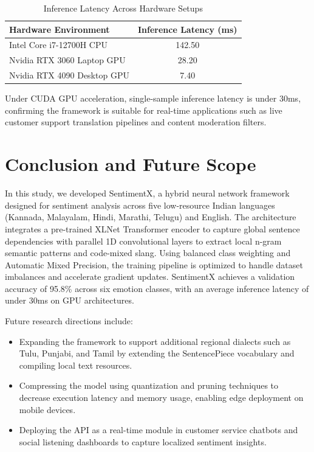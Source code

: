 \documentclass[conference]{IEEEtran}
\begin{document}
\begin{table}[h]
\caption{Inference Latency Across Hardware Setups}
\label{tab:latency}
\centering
\begin{tabular}{lc}
\toprule
\textbf{Hardware Environment} & \textbf{Inference Latency (ms)} \\
\midrule
Intel Core i7-12700H CPU & 142.50 \\
Nvidia RTX 3060 Laptop GPU & 28.20 \\
Nvidia RTX 4090 Desktop GPU & 7.40 \\
\bottomrule
\end{tabular}
\end{table}

Under CUDA GPU acceleration, single-sample inference latency is under 30ms, confirming the framework is suitable for real-time applications such as live customer support translation pipelines and content moderation filters.

\section{Conclusion and Future Scope}
In this study, we developed SentimentX, a hybrid neural network framework designed for sentiment analysis across five low-resource Indian languages (Kannada, Malayalam, Hindi, Marathi, Telugu) and English. The architecture integrates a pre-trained XLNet Transformer encoder to capture global sentence dependencies with parallel 1D convolutional layers to extract local n-gram semantic patterns and code-mixed slang. Using balanced class weighting and Automatic Mixed Precision, the training pipeline is optimized to handle dataset imbalances and accelerate gradient updates. SentimentX achieves a validation accuracy of 95.8\% across six emotion classes, with an average inference latency of under 30ms on GPU architectures.

Future research directions include:
\begin{itemize}
    \item Expanding the framework to support additional regional dialects such as Tulu, Punjabi, and Tamil by extending the SentencePiece vocabulary and compiling local text resources.
    \item Compressing the model using quantization and pruning techniques to decrease execution latency and memory usage, enabling edge deployment on mobile devices.
    \item Deploying the API as a real-time module in customer service chatbots and social listening dashboards to capture localized sentiment insights.
\end{itemize}
\end{document}
